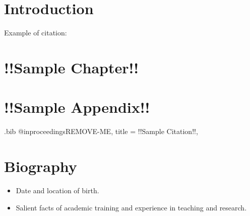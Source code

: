 \documentclass[12pt, oneside]{book}
\begin{document}
\mainmatter

\chapter{Introduction}

Example of citation: \cite{REMOVE-ME} %

\lipsum %

\chapter{!!Sample Chapter!!}

\lipsum %

\appendix

\chapter{!!Sample Appendix!!}

\lipsum %

\backmatter

\begin{filecontents*}{\jobname.bib}
@inproceedings{REMOVE-ME,
  title = {!!Sample Citation!!},
} 
\end{filecontents*}



\chapter{Biography}

\begin{itemize}
  \item Date and location of birth.
  \item Salient facts of academic training and experience in teaching and research.
\end{itemize}
\end{document}
